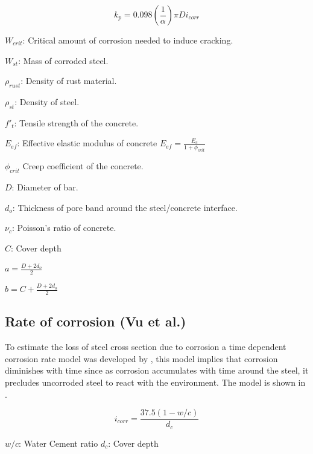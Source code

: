\begin{equation}
  k_p=0.098 (\frac{1}{\alpha})\pi Di_{corr}
  \label{eq.four}
\end{equation} 

$W_{crit}$: Critical amount of corrosion needed to induce cracking.

$W_{st}$: Mass of corroded steel.

$\rho_{rust}$: Density of rust material.

$\rho_{st}$: Density of steel.

$f'_t$: Tensile strength of the concrete. 

$E_{ef}$: Effective elastic modulus of concrete $E_{ef}=\frac{E_c}{1+\phi_{crit}}$ 

$\phi_{crit}$ Creep coefficient of the concrete.

$D$: Diameter of bar.

$d_o$: Thickness of pore band around the steel/concrete interface.

$\nu_c$: Poisson's ratio of concrete.

$C$: Cover depth

$a=\frac{D+2d_o}{2}$

$b=C+\frac{D+2d_o}{2}$

\subsection{Rate of corrosion (Vu et al.)}

To estimate the loss of steel cross section due to corrosion a time dependent corrosion rate model was developed by \cite{Vu2000}, this model implies that corrosion diminishes with time since as corrosion accumulates with time around the steel, it precludes uncorroded steel to react with the environment. The model is shown in .

\begin{equation}
  i_{corr}=\frac{37.5(1-w/c)}{d_c}
  \label{eq.five}
\end{equation} 

$w/c$: Water Cement ratio
$d_c$: Cover depth

